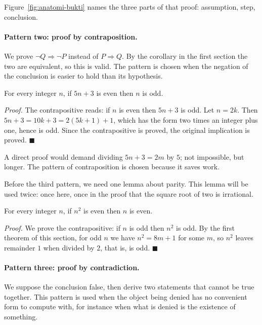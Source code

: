 Figure~\ref{fig:anatomi-bukti} names the three parts of that proof: assumption, step,
conclusion.

\paragraph{Pattern two: proof by contraposition.} We prove $\neg Q \Rightarrow \neg P$
instead of $P \Rightarrow Q$. By the corollary in the first section the two are equivalent,
so this is valid. The pattern is chosen when the negation of the conclusion is easier to hold than
its hypothesis.

\begin{proposisi}
For every integer $n$, if $5n+3$ is even then $n$ is odd.
\end{proposisi}
\par\smallskip\noindent\textit{Proof.} The contrapositive reads: if $n$ is even then
$5n+3$ is odd. Let $n = 2k$. Then $5n+3 = 10k+3 = 2(5k+1)+1$, which has the form two
times an integer plus one, hence is odd. Since the contrapositive is proved, the
original implication is proved.
\hfill$\blacksquare${\parfillskip=0pt\par}

A direct proof would demand dividing $5n+3 = 2m$ by $5$; not impossible,
but longer. The pattern of contraposition is chosen because it saves work.

Before the third pattern, we need one lemma about parity. This lemma will be used twice:
once here, once in the proof that the square root of two is irrational.

\begin{lemma}
For every integer $n$, if $n^{2}$ is even then $n$ is even.
\end{lemma}
\par\smallskip\noindent\textit{Proof.} We prove the contrapositive: if $n$ is odd
then $n^{2}$ is odd. By the first theorem of this section, for odd $n$ we have
$n^{2} = 8m+1$ for some $m$, so $n^{2}$ leaves remainder $1$ when divided by $2$, that is,
is odd.
\hfill$\blacksquare${\parfillskip=0pt\par}

\paragraph{Pattern three: proof by contradiction.} We suppose the conclusion false, then derive two statements that cannot be true
together. This pattern is used when the object being denied has no convenient form
to compute with, for instance when what is denied is the existence of something.

